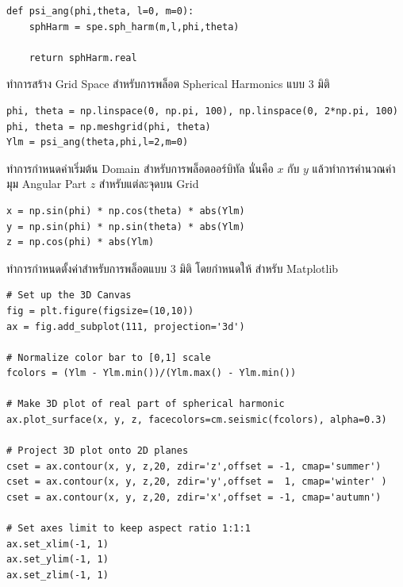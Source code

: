 \begin{lstlisting}[style=MyPython]
def psi_ang(phi,theta, l=0, m=0):
    sphHarm = spe.sph_harm(m,l,phi,theta)
    
    return sphHarm.real
\end{lstlisting}

\noindent ทำการสร้าง Grid Space สำหรับการพล็อต Spherical Harmonics แบบ 3 มิติ

\begin{lstlisting}[style=MyPython]
phi, theta = np.linspace(0, np.pi, 100), np.linspace(0, 2*np.pi, 100)
phi, theta = np.meshgrid(phi, theta)
Ylm = psi_ang(theta,phi,l=2,m=0)
\end{lstlisting}

\noindent ทำการกำหนดค่าเริ่มต้น Domain สำหรับการพล็อตออร์บิทัล นั่นคือ $x$ กับ $y$ แล้วทำการคำนวณค่ามุม Angular Part $z$ 
สำหรับแต่ละจุดบน Grid

\begin{lstlisting}[style=MyPython]
x = np.sin(phi) * np.cos(theta) * abs(Ylm)
y = np.sin(phi) * np.sin(theta) * abs(Ylm)
z = np.cos(phi) * abs(Ylm)
\end{lstlisting}

\noindent ทำการกำหนดตั้งค่าสำหรับการพล็อตแบบ 3 มิติ โดยกำหนดให้  สำหรับ Matplotlib

\begin{lstlisting}[style=MyPython]
# Set up the 3D Canvas
fig = plt.figure(figsize=(10,10))
ax = fig.add_subplot(111, projection='3d')

# Normalize color bar to [0,1] scale
fcolors = (Ylm - Ylm.min())/(Ylm.max() - Ylm.min())

# Make 3D plot of real part of spherical harmonic
ax.plot_surface(x, y, z, facecolors=cm.seismic(fcolors), alpha=0.3)

# Project 3D plot onto 2D planes
cset = ax.contour(x, y, z,20, zdir='z',offset = -1, cmap='summer')
cset = ax.contour(x, y, z,20, zdir='y',offset =  1, cmap='winter' )
cset = ax.contour(x, y, z,20, zdir='x',offset = -1, cmap='autumn')

# Set axes limit to keep aspect ratio 1:1:1
ax.set_xlim(-1, 1)
ax.set_ylim(-1, 1)
ax.set_zlim(-1, 1)
\end{lstlisting}

